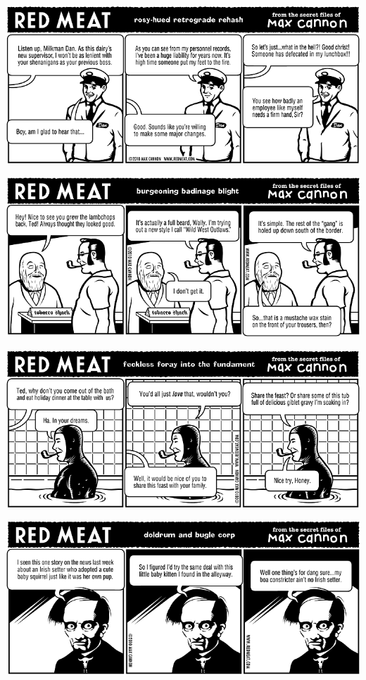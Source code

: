 \documentclass[a4paper,twoside,11pt]{article}
\begin{document}
\includegraphics[width=\textwidth]{redmeat_2010-11-16.png}



\includegraphics[width=\textwidth]{redmeat_2010-11-23.png}



\includegraphics[width=\textwidth]{redmeat_2010-11-30.png}



\includegraphics[width=\textwidth]{redmeat_2010-12-07.png}
\end{document}
